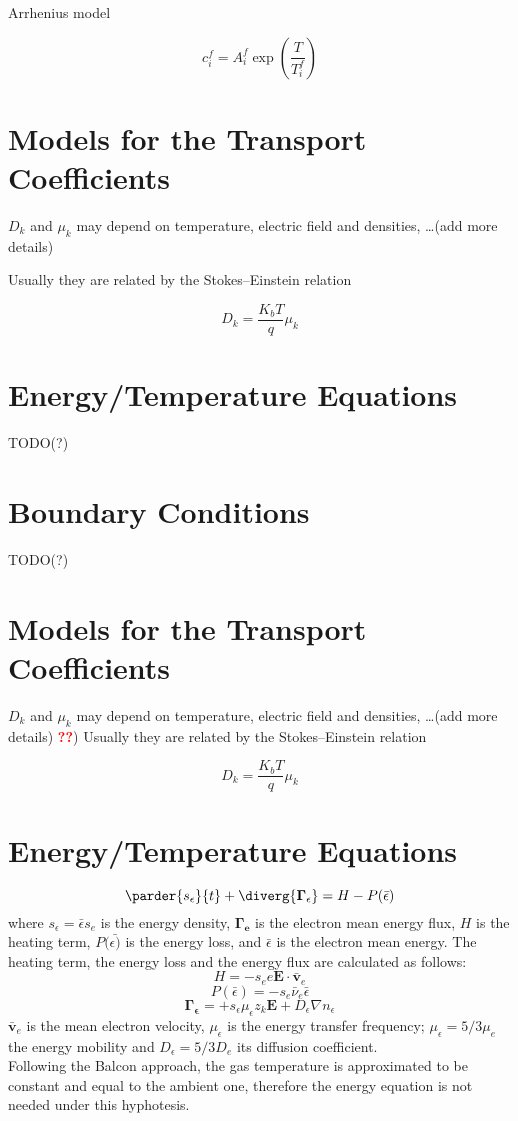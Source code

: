 \documentclass[11pt]{amsart}
\begin{document}
Arrhenius model

$$
c^{f}_i = A^{f}_{i} \exp\left( \dfrac{T}{T^{f}_{i}} \right)
$$

\section{Models for the Transport Coefficients}

$D_{k}$ and $\mu_{k}$ may depend on temperature, electric field and densities, \dots(add more details)

Usually they are related by the Stokes--Einstein relation 

$$
D_{k} = \dfrac{K_{b} T}{q} \mu_{k}
$$

\section{Energy/Temperature Equations}
TODO(?)

\section{Boundary Conditions}
TODO(?)


\section{Models for the Transport Coefficients}

$D_{k}$ and $\mu_{k}$ may depend on temperature, electric field and densities, \dots(add more details)
\textcolor{red}{\textbf{??}})
Usually they are related by the Stokes--Einstein relation 

$$
D_{k} = \dfrac{K_{b} T}{q} \mu_{k}
$$

\section{Energy/Temperature Equations}
$$
\parder{s_\epsilon}{t} + \diverg{\mathbf{{\Gamma_\epsilon}}} = H - P(\bar{\epsilon})
$$
where $s_\epsilon = \bar{\epsilon} s_e$ is the energy density, $\mathbf{\Gamma_e}$ is the electron mean energy flux, $H$ is the heating term, $P(\bar{\epsilon)}$ is the energy loss, and $\bar{\epsilon}$ is the electron mean energy.
The heating term, the energy loss and the energy flux are calculated as follows:
$$
H=-s_e e \mathbf{E} \cdot  \mathbf{\bar{v}}_e
$$ 
$$
P(\bar{\epsilon})=-s_e\bar{\nu}_e\bar{\epsilon}
$$
$$
\mathbf{\Gamma_\epsilon}= +s_\epsilon \mu_\epsilon z_k \mathbf{E} + D_\epsilon\nabla n_\epsilon
$$    
$\mathbf{\bar{v}}_e$ is the mean electron velocity, $\mu_\epsilon$ is the energy transfer frequency;
$\mu_\epsilon = 5/3\mu_e$ the energy mobility and $D_\epsilon = 5/3 D_e$ its diffusion coefficient.\\
Following the Balcon approach, the gas temperature is approximated to be constant and equal to the ambient one, therefore the energy equation is not needed under this hyphotesis.
\end{document}

